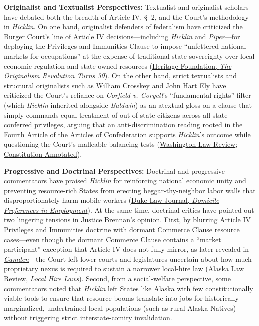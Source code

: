 \documentclass[12pt]{article}
\begin{document}
\textbf{Originalist and Textualist Perspectives:} Textualist and originalist scholars have debated both the breadth of Article IV, \S\ 2, and the Court's methodology in \textit{Hicklin}. On one hand, originalist defenders of federalism have criticized the Burger Court's line of Article IV decisions---including \textit{Hicklin} and \textit{Piper}---for deploying the Privileges and Immunities Clause to impose ``unfettered national markets for occupations'' at the expense of traditional state sovereignty over local economic regulation and state-owned resources (\href{https://www.heritage.org/the-constitution/report/the-originalism-revolution-turns-30-evaluating-its-impact-and-future}{Heritage Foundation, \textit{The Originalism Revolution Turns 30}}). On the other hand, strict textualists and structural originalists such as William Crosskey and John Hart Ely have criticized the Court's reliance on \textit{Corfield v. Coryell}'s ``fundamental rights'' filter (which \textit{Hicklin} inherited alongside \textit{Baldwin}) as an atextual gloss on a clause that simply commands equal treatment of out-of-state citizens across all state-conferred privileges, arguing that an anti-discrimination reading rooted in the Fourth Article of the Articles of Confederation supports \textit{Hicklin}'s outcome while questioning the Court's malleable balancing tests (\href{https://digitalcommons.law.uw.edu/cgi/viewcontent.cgi?article=2277&context=wlr}{Washington Law Review}; \href{https://constitution.congress.gov/browse/essay/artIV-S2-C1-1/ALDE_00013777/}{Constitution Annotated}).

\textbf{Progressive and Doctrinal Perspectives:} Doctrinal and progressive commentators have praised \textit{Hicklin} for reinforcing national economic unity and preventing resource-rich States from erecting beggar-thy-neighbor labor walls that disproportionately harm mobile workers (\href{https://scholarship.law.duke.edu/cgi/viewcontent.cgi?article=2677&context=dlj}{Duke Law Journal, \textit{Domicile Preferences in Employment}}). At the same time, doctrinal critics have pointed out two lingering tensions in Justice Brennan's opinion. First, by blurring Article IV Privileges and Immunities doctrine with dormant Commerce Clause resource cases---even though the dormant Commerce Clause contains a ``market participant'' exception that Article IV does not fully mirror, as later revealed in \href{https://supreme.justia.com/cases/federal/us/465/208/}{\textit{Camden}}---the Court left lower courts and legislatures uncertain about how much proprietary nexus is required to sustain a narrower local-hire law (\href{https://scholarship.law.duke.edu/cgi/viewcontent.cgi?article=1235&context=alr}{Alaska Law Review, \textit{Local Hire Laws}}). Second, from a social-welfare perspective, some commentators noted that \textit{Hicklin} left States like Alaska with few constitutionally viable tools to ensure that resource booms translate into jobs for historically marginalized, undertrained local populations (such as rural Alaska Natives) without triggering strict interstate-comity invalidation.
\end{document}
